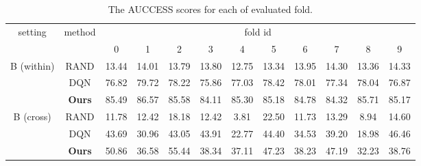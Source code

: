 \documentclass{article} \usepackage{iclr2021_conference,times}
\begin{document}
\begin{table}[h]
\centering
\setlength{\tabcolsep}{3pt}
\renewcommand{\arraystretch}{1.37}
\begin{tabular}{c|c|cccccccccc}
\multirow{2}{*}{setting} & \multirow{2}{*}{method} & \multicolumn{10}{c}{fold id} \\
& & 0 & 1 & 2 & 3 & 4 & 5 & 6 & 7 & 8 & 9 \\
\hline
\hline
\multirow{3}{*}{B (within)} & RAND & 13.44 & 14.01 & 13.79 & 13.80 & 12.75 & 13.34 & 13.95 & 14.30 & 13.36 & 14.33 \\
 & DQN & 76.82 & 79.72 & 78.22 & 75.86 & 77.03 & 78.42 & 78.01 & 77.34 & 78.04 & 76.87 \\
 & \textbf{Ours} & 85.49 & 86.57 & 85.58 & 84.11 & 85.30 & 85.18 & 84.78 & 84.32 & 85.71 & 85.17 \\
\hline
\multirow{3}{*}{B (cross)}  & RAND & 11.78 & 12.42 & 18.18 & 12.42 & 3.81 & 22.50 & 11.73 & 13.29 & 8.94 & 14.60\\
& DQN & 43.69 & 30.96 & 43.05 & 43.91 & 22.77 & 44.40 & 34.53 & 39.20 & 18.98 & 46.46 \\
& \textbf{Ours} & 50.86 & 36.58 & 55.44 & 38.34 & 37.11 & 47.23 & 38.23 & 47.19 & 32.23 & 38.76 \\
\end{tabular}
\caption{The AUCCESS scores for each of evaluated fold.}
\label{tab:phyre_detail}
\vspace{-1.0em}
\end{table}
\end{document}
